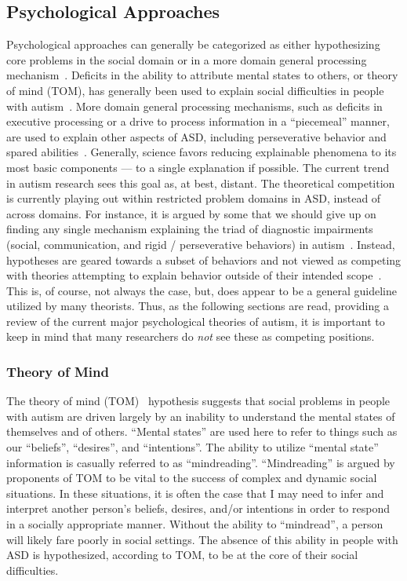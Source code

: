 \documentclass[man]{apa}
\begin{document}
\subsection{Psychological Approaches}
	Psychological approaches can generally be categorized as either hypothesizing core problems in the social domain or in a more domain general processing mechanism~\cite{RefWorks:85}.  Deficits in the ability to attribute mental states to others, or theory of mind (TOM), has generally been used to explain social difficulties in people with autism~\cite{Baron-Cohen:1985:AutismTOM}.  More domain general processing mechanisms, such as deficits in executive processing or a drive to process information in a ``piecemeal'' manner, are used to explain other aspects of ASD, including perseverative behavior and spared abilities~\cite{HillEL:2004:AutismExecutiveDysfunction}.  Generally, science favors reducing explainable phenomena to its most basic components --- to a single explanation if possible.  The current trend in autism research sees this goal as, at best, distant.  The theoretical competition is currently playing out within restricted problem domains in ASD, instead of across domains.  For instance, it is argued by some that we should give up on finding any single mechanism explaining the triad of diagnostic impairments (social, communication, and rigid / perseverative behaviors) in autism~\cite{RefWorks:85}.  Instead, hypotheses are geared towards a subset of behaviors and not viewed as competing with theories attempting to explain behavior outside of their intended scope~\cite{RefWorks:117}.  This is, of course, not always the case, but, does appear to be a general guideline utilized by many theorists. Thus, as the following sections are read, providing a review of the current major psychological theories of autism, it is important to keep in mind that many researchers do \emph{not} see these as competing positions.

\subsubsection{Theory of Mind}

The theory of mind (TOM)~\cite{Baron-Cohen:1985:AutismTOM} hypothesis suggests that social problems in people with autism are driven largely by an inability to understand the mental states of themselves and of others.  ``Mental states'' are used here to refer
to things such as our ``beliefs'', ``desires'', and ``intentions''.  The ability to utilize ``mental state'' information is casually referred to as ``mindreading''.  ``Mindreading'' is argued by proponents of TOM to be vital to the success of complex and dynamic social situations. In these situations, it is often the case that I may need to infer and interpret another person's beliefs, desires, and/or intentions in order to respond in a socially appropriate manner.  Without the ability to ``mindread'', a person will likely fare poorly in social settings.  The absence of this ability in people with ASD is hypothesized, according to TOM, to be at the core of their social difficulties. 
\end{document}

